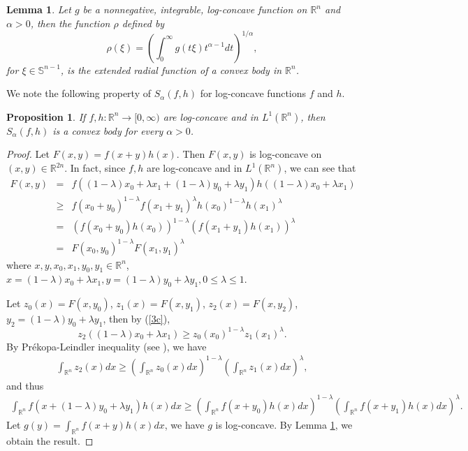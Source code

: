 \documentclass[preprint,12pt]{elsarticle}
\newtheorem{lem}{Lemma}
\newtheorem{pro}{Proposition}
\begin{document}
\begin{lem}\cite[Corollary 4.2]{GZ98}\label{3.11}
	Let $g$ be a nonnegative, integrable, log-concave function on ${\mathbb{R}}^{n}$ and  $\alpha > 0$, then the function $\rho$ defined by
	\begin{equation*}
		\rho(\xi)={\left(\int_{0}^{\infty }g(t\xi){t }^{\alpha-1}dt \right)}^{1/\alpha },
	\end{equation*}
	for $\xi \in {\mathbb{S}}^{n-1}$, is the extended radial function of a convex body in ${\mathbb{R}}^{n}$.
\end{lem}
We note the following property of ${S}_{\alpha }(f,h)$ for log-concave functions $f$ and $h$.
\begin{pro}
If $f,h:\mathbb{R}^n\to [0,\infty )$ are log-concave and in ${L}^{1} (\mathbb{R}^n)$, then ${S}_{\alpha }(f,h)$ is a convex body for every $\alpha >0$.
\end{pro}
\begin{proof}
Let $F(x,y)=f(x+y)h(x)$. Then $F(x,y)$ is log-concave on $(x,y)\in\mathbb{R}^{2n}$. In fact, since $f,h$ are log-concave and in ${L}^{1} (\mathbb{R}^n)$, we can see that
\begin{eqnarray}\label{3c}
F(x,y)
&=&f((1-\lambda){x}_{0}+\lambda{x}_{1}+(1-\lambda){y}_{0}+\lambda{y}_{1})h((1-\lambda){x}_{0}+\lambda{x}_{1})\nonumber\\
&\geq& {f({x}_{0}+{y}_{0})}^{1-\lambda }{f({x}_{1}+{y}_{1})}^{\lambda }{h({x}_{0})}^{1-\lambda }{h({x}_{1})}^{\lambda }\nonumber\\
&=&(f({x}_{0}+{y}_{0})h({x}_{0}))^{1-\lambda }(f({x}_{1}+{y}_{1})h({x}_{1}))^{\lambda }\nonumber\\
&=&F({x}_{0},{y}_{0})^{1-\lambda }F({x}_{1},{y}_{1})^{\lambda }
\end{eqnarray} 
where $x, y, {x}_{0}, {x}_{1}, {y}_{0}, {y}_{1}\in \mathbb{R}^n$, $x=(1-\lambda){x}_{0}+\lambda{x}_{1},y=(1-\lambda){y}_{0}+\lambda{y}_{1},0 \leq \lambda \leq 1$.


Let ${z}_{0}(x)=F(x,{y}_{0})$, ${z}_{1}(x)=F(x,{y}_{1})$, ${z}_{2}(x)=F(x,{y}_{2})$, ${y}_{2}=(1-\lambda){y}_{0}+\lambda{y}_{1}$, then by (\ref{3c}),
\begin{equation*}
{z}_{2}((1-\lambda){x}_{0}+\lambda{x}_{1})\geq{z}_{0}({x}_{0})^{1-\lambda }{z}_{1}({x}_{1})^{\lambda }.
\end{equation*} 
By Pr\'{e}kopa-Leindler inequality (see \cite[Theorem 4.2]{Gardner}), we have
\begin{eqnarray*}
\int_{\mathbb{R}^n}{z}_{2}(x)dx\geq \left(\int_{\mathbb{R}^n}z_{0}(x)dx \right)^{1-\lambda }\left(\int_{\mathbb{R}^n}z_{1}(x)dx\right )^{\lambda },
\end{eqnarray*} 
and thus
\begin{eqnarray*}
\int_{\mathbb{R}^n}f(x+(1-\lambda){y}_{0}+\lambda{y}_{1})h(x)dx\geq \left(\int_{\mathbb{R}^n}f(x+{y}_{0})h(x)dx\right)^{1-\lambda }\left(\int_{\mathbb{R}^n}f(x+{y}_{1})h(x)dx\right)^{\lambda }.
\end{eqnarray*}
Let $g(y)=\int_{\mathbb{R}^n}f(x+y)h(x)dx$, 
we have $g$ is log-concave.
By Lemma \ref{3.11}, we obtain the result.
\end{proof}
\end{document}
